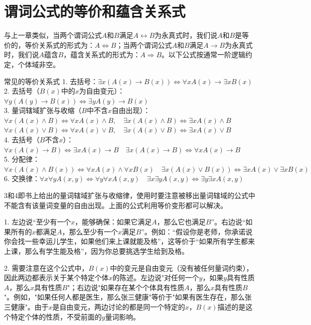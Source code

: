 \section{谓词公式的等价和蕴含关系式}
与上一章类似，当两个谓词公式$A$和$B$满足$A\leftrightarrow B$为永真式时，我们说$A$和$B$是等价的，等价关系式的形式为：$A\Leftrightarrow B$；当两个谓词公式$A$和$B$满足$A\rightarrow B$为永真式时，我们说$A$蕴含$B$，蕴含关系式的形式为：$A\Rightarrow B$。以下公式按通常一阶逻辑约定，个体域非空。
\begin{theorem}{常见的等价关系式}{}
1. 去括号：$\exists x(A(x)\to B(x))\Leftrightarrow \forall xA(x)\to \exists xB(x)$\\
2. 去括号（$B(x)$中的$x$为自由变元）：$\forall y(A(y)\to B(x))\Leftrightarrow \exists yA(y)\to B(x)$\\
3. 量词辖域扩张与收缩（$B$中不含$x$自由出现）：\\
$\forall x(A(x)\land B)\Leftrightarrow \forall xA(x)\land B,\quad \exists x(A(x)\land B)\Leftrightarrow \exists xA(x)\land B$\\
$\forall x(A(x)\lor B)\Leftrightarrow \forall xA(x)\lor B,\quad \exists x(A(x)\lor B)\Leftrightarrow \exists xA(x)\lor B$\\
4. 去括号（$B$不含$x$）：$\forall x(A(x)\to B)\Leftrightarrow \exists xA(x)\to B\quad  \exists x(A(x)\to B)\Leftrightarrow \forall xA(x)\to B$\\
5. 分配律：$\forall x(A(x)\land B(x))\Leftrightarrow \forall xA(x)\land \forall xB(x)\quad \exists x(A(x)\lor B(x))\Leftrightarrow \exists xA(x)\lor \exists xB(x)$\\
6. 交换律：$\forall x\forall y A(x,y)\Leftrightarrow \forall y\forall x A(x,y)\quad \exists x\exists y A(x,y)\Leftrightarrow \exists y\exists x A(x,y)$
\end{theorem}
3和4即书上给出的量词辖域扩张与收缩律，使用时要注意被移出量词辖域的公式中不能含有该量词变量的自由出现。上面的公式利用等价变形都可以解决。

1. 左边说“至少有一个$x$，能够确保：如果它满足$A$，那么它也满足$B$”。右边说“如果所有的$x$都满足$A$，那么至少有一个$x$满足$B$”。例如：“假设你是老师，你承诺说你会找一些幸运儿学生，如果他们来上课就能及格”，这等价于“如果所有学生都来上课，那么有学生能及格”，因为你总要挑选学生给到及格。

2. 需要注意在这个公式中，$B(x)$中的变元是自由变元（没有被任何量词约束），因此两边都表示关于某个特定个体$x$的陈述。左边说"对任何一个$y$，如果$y$具有性质$A$，那么$x$具有性质$B$"；右边说"如果存在某个个体具有性质$A$，那么$x$具有性质$B$"。例如，"如果任何人都是医生，那么张三健康"等价于"如果有医生存在，那么张三健康"。由于$x$是自由变元，两边讨论的都是同一个特定的$x$，$B(x)$描述的是这个特定个体的性质，不受前面的$y$量词影响。

